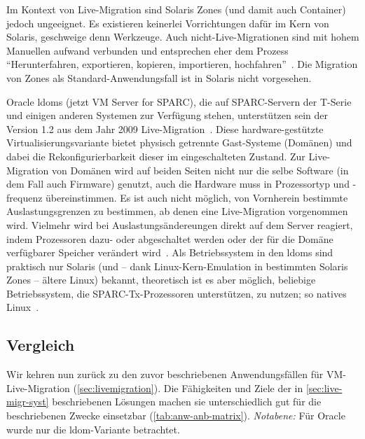 Im Kontext von Live-Migration sind Solaris Zones (und damit auch
Container) jedoch ungeeignet. Es existieren keinerlei Vorrichtungen
dafür im Kern von Solaris, geschweige denn Werkzeuge. Auch
nicht-Live-Migrationen sind mit hohem Manuellen aufwand verbunden und
entsprechen eher dem Prozess "`Herunterfahren, exportieren, kopieren,
importieren, hochfahren"'~\cite{Kimchi:Solaris-Zones-m}. Die Migration
von Zones als Standard-Anwendungsfall ist in Solaris nicht vorgesehen.

Oracle \acfp{ldom} (jetzt VM Server for SPARC), die auf SPARC-Servern
der T-Serie und einigen anderen Systemen zur Verfügung stehen,
unterstützen sein der Version 1.2 aus dem Jahr 2009
Live-Migration~\cite{Laurent:Answering-a-cus}. Diese
hardware-gestützte Virtualisierungsvariante bietet physisch getrennte
Gast-Systeme (Domänen) und dabei die Rekonfigurierbarkeit dieser im
eingeschalteten Zustand. Zur Live-Migration von Domänen wird auf
beiden Seiten nicht nur die selbe Software (in dem Fall auch Firmware)
genutzt, auch die Hardware muss in Prozessortyp und -frequenz
übereinstimmen. Es ist auch nicht möglich, von Vornherein bestimmte
Auslastungsgrenzen zu bestimmen, ab denen eine Live-Migration
vorgenommen wird. Vielmehr wird bei Auslastungsändereungen direkt auf
dem Server reagiert, indem \zB Prozessoren dazu- oder abgeschaltet
werden oder der für die Domäne verfügbarer Speicher verändert
wird~\cite{2010:Oracle-VM-Serve}. Als Betriebssystem in den \acp{ldom}
sind praktisch nur Solaris (und -- dank Linux-Kern-Emulation in
bestimmten Solaris Zones -- ältere Linux) bekannt, theoretisch ist es
aber möglich, beliebige Betriebssystem, die SPARC-Tx-Prozessoren
unterstützen, zu nutzen; so \zB natives Linux~\cite{Chartre:Linux-with-LDom}.



\subsection{Vergleich}
Wir kehren nun zurück zu den zuvor beschriebenen Anwendungsfällen für
\ac{VM}-Live-Migration (\autoref{sec:livemigration}). Die Fähigkeiten und Ziele
der in \autoref{sec:live-migr-syst} beschriebenen Lösungen
machen sie unterschiedlich gut für die beschriebenen Zwecke
einsetzbar (\autoref{tab:anw-anb-matrix}). \emph{Notabene: } Für
Oracle wurde nur die \ac{ldom}-Variante betrachtet.



